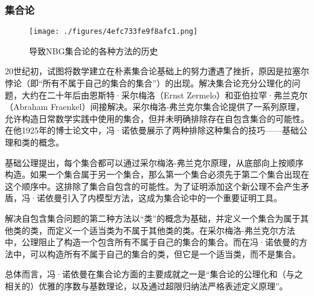 \subsubsection{集合论}
\begin{figure}[ht]
\centering
\texttt{[image: ./figures/4efc733fe9f8afc1.png]}
\caption{导致NBG集合论的各种方法的历史} \label{fig_Neuman_4}
\end{figure}
20世纪初，试图将数学建立在朴素集合论基础上的努力遭遇了挫折，原因是拉塞尔悖论（即“所有不属于自己的集合的集合”）的出现。解决集合论充分公理化的问题，大约在二十年后由恩斯特·采尔梅洛（Ernst Zermelo）和亚伯拉罕·弗兰克尔（Abraham Fraenkel）间接解决。采尔梅洛-弗兰克尔集合论提供了一系列原理，允许构造日常数学实践中使用的集合，但并未明确排除存在自包含集合的可能性。在他1925年的博士论文中，冯·诺依曼展示了两种排除这种集合的技巧——基础公理和类的概念。

基础公理提出，每个集合都可以通过采尔梅洛-弗兰克尔原理，从底部向上按顺序构造。如果一个集合属于另一个集合，那么第一个集合必须先于第二个集合出现在这个顺序中。这排除了集合自包含的可能性。为了证明添加这个新公理不会产生矛盾，冯·诺依曼引入了内模型方法，这成为集合论中的一个重要证明工具。

解决自包含集合问题的第二种方法以“类”的概念为基础，并定义一个集合为属于其他类的类，而定义一个适当类为不属于其他类的类。在采尔梅洛-弗兰克尔方法中，公理阻止了构造一个包含所有不属于自己的集合的集合。而在冯·诺依曼的方法中，可以构造所有不属于自己的集合的类，但它是一个适当类，而不是集合。

总体而言，冯·诺依曼在集合论方面的主要成就之一是“集合论的公理化和（与之相关的）优雅的序数与基数理论，以及通过超限归纳法严格表述定义原理”。
